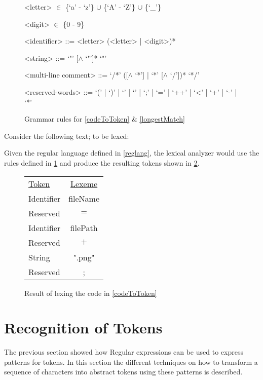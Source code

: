 \begin{figure}[h!]
\begin{addmargin}[2em]{0em}
\begin{grammar}

<letter>  $\in$ \{`a' - `z'\} $\cup$ \{`A' - `Z'\} $\cup$ \{`_'\}

<digit>  $\in$ \{0 - 9\}

<identifier> ::= <letter> (<letter> | <digit>)* 

<string> ::= `"' [$\wedge$ `"']* `"'

<multi-line comment> ::= `/*' ([$\wedge$ `*'] | `*' [$\wedge$ `/'])* `*/'

<reserved-words> ::= `(' | `)' | `{' | `}' | `;' | `=' | `++' | `<' | `+' | `-' | `*'

\end{grammar}
\end{addmargin}
\caption{Grammar rules for \cref{codeToToken} \& \cref{longestMatch}\label{fig:grammar}}
\end{figure}

\begin{example} \label{codeToToken}$ $\\
Consider the following text; to be lexed:

Given the regular language defined in \cref{reglang}, the lexical analyzer would
use the rules defined in \cref{fig:grammar} and produce the resulting
tokens shown in \cref{fig:codeToToken}.

\begin{figure}[h!]
\begin{center}
\begin{tabular}{l c}
\underline{Token} & \underline{Lexeme}\\
Identifier & fileName\\
Reserved & $=$\\
Identifier & filePath\\
Reserved & $+$\\
String & ".png"\\
Reserved & ;
\end{tabular}
\end{center}
\caption{Result of lexing the code in \cref{codeToToken} \label{fig:codeToToken}}
\end{figure}
\end{example}

\section{Recognition of Tokens}
The previous section showed how Regular expressions can be used
to express patterns for tokens. In this section the different techniques on how
to transform a sequence of characters into abstract tokens using these patterns
is described.

